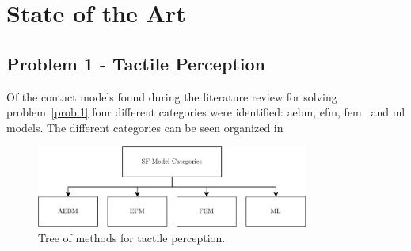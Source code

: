 \chapter{State of the Art}\label{ch:state-of-the-art}

\section{Problem 1 - Tactile Perception}\label{sec:lit-rev-problem-1}

Of the contact models found during the literature review for solving problem~\ref{prob:1}
four different categories were identified: \gls{aebm}, \gls{efm}, \gls{fem}~\cite{a-modified-elastic-foundation-contact-model-for-application-in-3d-models-of-the-prosthetic-knee} and \gls{ml} models. The different categories can be seen organized in  \medskip
%
\begin{figure}[h]
	\begin{small}
		\begin{center}
			\includegraphics[width=0.8\textwidth]{chapters/state-of-the-art/fig/sf-categories.pdf}
		\end{center}
		\caption{Tree of methods for tactile perception.}
		\label{fig:sf-categories}
	\end{small}
\end{figure}

